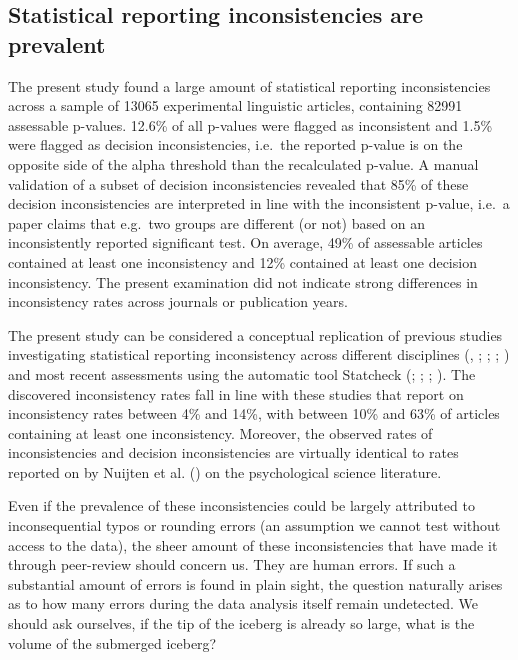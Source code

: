 \documentclass[
  doc,
  longtable,
  nolmodern,
  notxfonts,
  notimes,
  colorlinks=true,linkcolor=blue,citecolor=blue,urlcolor=blue]{apa7}
\begin{document}
\subsection{Statistical reporting inconsistencies are
prevalent}\label{statistical-reporting-inconsistencies-are-prevalent}

The present study found a large amount of statistical reporting
inconsistencies across a sample of 13065 experimental linguistic
articles, containing 82991 assessable p-values. 12.6\% of all p-values
were flagged as inconsistent and 1.5\% were flagged as decision
inconsistencies, i.e.~the reported p-value is on the opposite side of
the alpha threshold than the recalculated p-value. A manual validation
of a subset of decision inconsistencies revealed that 85\% of these
decision inconsistencies are interpreted in line with the inconsistent
p-value, i.e.~a paper claims that e.g.~two groups are different (or not)
based on an inconsistently reported significant test. On average, 49\%
of assessable articles contained at least one inconsistency and 12\%
contained at least one decision inconsistency. The present examination
did not indicate strong differences in inconsistency rates across
journals or publication years.

The present study can be considered a conceptual replication of previous
studies investigating statistical reporting inconsistency across
different disciplines (, ;
;
;
) and most
recent assessments using the automatic tool Statcheck
(;
;
;
). The
discovered inconsistency rates fall in line with these studies that
report on inconsistency rates between 4\% and 14\%, with between 10\%
and 63\% of articles containing at least one inconsistency. Moreover,
the observed rates of inconsistencies and decision inconsistencies are
virtually identical to rates reported on by Nuijten et al.
() on the psychological
science literature.

Even if the prevalence of these inconsistencies could be largely
attributed to inconsequential typos or rounding errors (an assumption we
cannot test without access to the data), the sheer amount of these
inconsistencies that have made it through peer-review should concern us.
They are human errors. If such a substantial amount of errors is found
in plain sight, the question naturally arises as to how many errors
during the data analysis itself remain undetected. We should ask
ourselves, if the tip of the iceberg is already so large, what is the
volume of the submerged iceberg?
\end{document}
